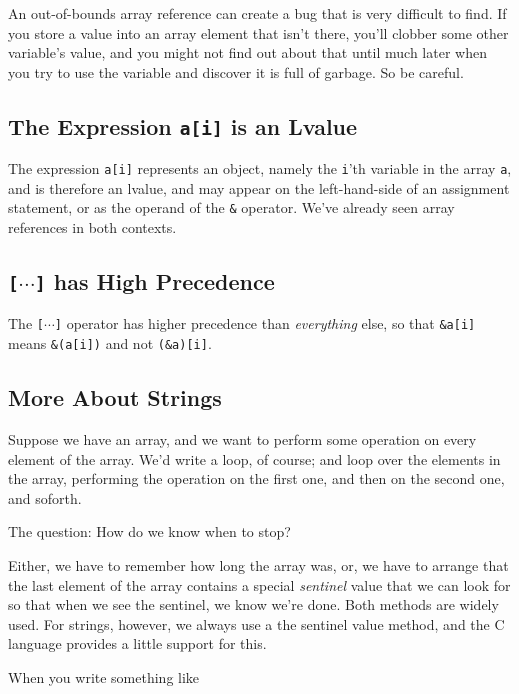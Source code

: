 An out-of-bounds array reference can create a bug that is very difficult
to find.  If you store a value into an array element that isn't there,
you'll clobber some other variable's value, and you might not find out
about that until much later when you try to use the variable and
discover it is full of garbage.  So be careful.

\subsection{The Expression {\tt a[i]} is an Lvalue}

The expression {\tt a[i]} represents an object, namely the {\tt i}'th
variable in the array {\tt a}, and is therefore an lvalue, and may
appear on the left-hand-side of an assignment statement, or as the
operand of the {\tt\&} operator.  We've already seen array references in
both contexts.

\subsection{{\tt[$\cdots$]} has High Precedence}

The {\tt[{$\cdots$}]} operator has higher precedence than {\em
everything}\/ else, so that {\tt\&a[i]} means {\tt\&(a[i])} and not
{\tt(\&a)[i]}. 

\subsection{More About Strings}

Suppose we have an array, and we want to perform some operation on every
element of the array.  We'd write a loop, of course; and loop over the
elements in the array, performing the operation on the first one, and
then on the second one, and soforth.

The question:  How do we know when to stop?

Either, we have to remember how long the array was, or, we have to
arrange that the last element of the array contains a special {\em
sentinel}\/ value that we can look for so that when we see the sentinel,
we know we're done.  Both methods are widely used.  For strings,
however, we always use a the sentinel value method, and the C language
provides a little support for this.

When you write something like

\begin{flushleft}
\verb% char name[] = "Jean Ogrinz"; %  
\end{flushleft}

